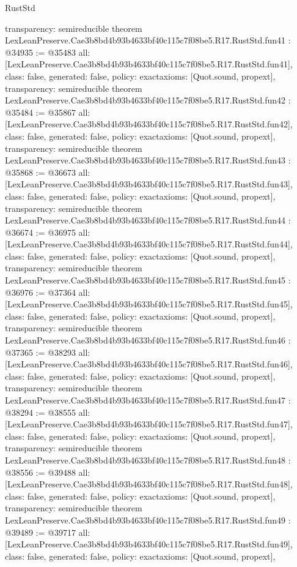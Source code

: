 \begin{lexlean}{RustStd}
\begin{coremodule}
{  transparency: semireducible
}
theorem LexLeanPreserve.Cae3b8bd4b93b4633bf40c115c7f08be5.R17.RustStd.fun41 : @34935 := @35483 {
  all: [LexLeanPreserve.Cae3b8bd4b93b4633bf40c115c7f08be5.R17.RustStd.fun41],
  class: false,
  generated: false,
  policy: exact{axioms: [Quot.sound, propext]},
  transparency: semireducible
}
theorem LexLeanPreserve.Cae3b8bd4b93b4633bf40c115c7f08be5.R17.RustStd.fun42 : @35484 := @35867 {
  all: [LexLeanPreserve.Cae3b8bd4b93b4633bf40c115c7f08be5.R17.RustStd.fun42],
  class: false,
  generated: false,
  policy: exact{axioms: [Quot.sound, propext]},
  transparency: semireducible
}
theorem LexLeanPreserve.Cae3b8bd4b93b4633bf40c115c7f08be5.R17.RustStd.fun43 : @35868 := @36673 {
  all: [LexLeanPreserve.Cae3b8bd4b93b4633bf40c115c7f08be5.R17.RustStd.fun43],
  class: false,
  generated: false,
  policy: exact{axioms: [Quot.sound, propext]},
  transparency: semireducible
}
theorem LexLeanPreserve.Cae3b8bd4b93b4633bf40c115c7f08be5.R17.RustStd.fun44 : @36674 := @36975 {
  all: [LexLeanPreserve.Cae3b8bd4b93b4633bf40c115c7f08be5.R17.RustStd.fun44],
  class: false,
  generated: false,
  policy: exact{axioms: [Quot.sound, propext]},
  transparency: semireducible
}
theorem LexLeanPreserve.Cae3b8bd4b93b4633bf40c115c7f08be5.R17.RustStd.fun45 : @36976 := @37364 {
  all: [LexLeanPreserve.Cae3b8bd4b93b4633bf40c115c7f08be5.R17.RustStd.fun45],
  class: false,
  generated: false,
  policy: exact{axioms: [Quot.sound, propext]},
  transparency: semireducible
}
theorem LexLeanPreserve.Cae3b8bd4b93b4633bf40c115c7f08be5.R17.RustStd.fun46 : @37365 := @38293 {
  all: [LexLeanPreserve.Cae3b8bd4b93b4633bf40c115c7f08be5.R17.RustStd.fun46],
  class: false,
  generated: false,
  policy: exact{axioms: [Quot.sound, propext]},
  transparency: semireducible
}
theorem LexLeanPreserve.Cae3b8bd4b93b4633bf40c115c7f08be5.R17.RustStd.fun47 : @38294 := @38555 {
  all: [LexLeanPreserve.Cae3b8bd4b93b4633bf40c115c7f08be5.R17.RustStd.fun47],
  class: false,
  generated: false,
  policy: exact{axioms: [Quot.sound, propext]},
  transparency: semireducible
}
theorem LexLeanPreserve.Cae3b8bd4b93b4633bf40c115c7f08be5.R17.RustStd.fun48 : @38556 := @39488 {
  all: [LexLeanPreserve.Cae3b8bd4b93b4633bf40c115c7f08be5.R17.RustStd.fun48],
  class: false,
  generated: false,
  policy: exact{axioms: [Quot.sound, propext]},
  transparency: semireducible
}
theorem LexLeanPreserve.Cae3b8bd4b93b4633bf40c115c7f08be5.R17.RustStd.fun49 : @39489 := @39717 {
  all: [LexLeanPreserve.Cae3b8bd4b93b4633bf40c115c7f08be5.R17.RustStd.fun49],
  class: false,
  generated: false,
  policy: exact{axioms: [Quot.sound, propext]},
}
\end{coremodule}
\end{lexlean}
